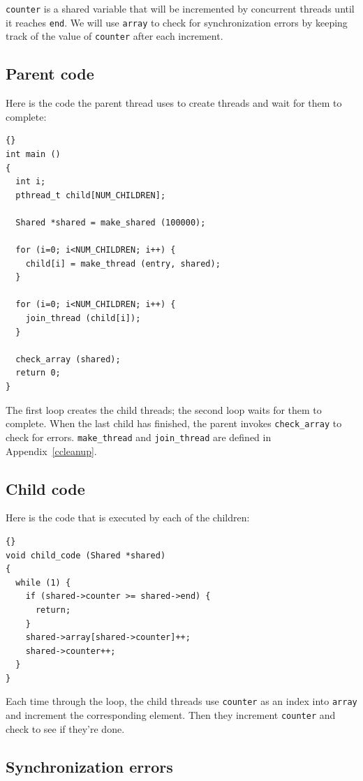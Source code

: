 \documentclass{book}
\begin{document}
{\tt counter} is a shared variable that will be incremented by
concurrent threads until it reaches {\tt end}.  We will use
{\tt array} to check for synchronization errors by keeping track
of the value of {\tt counter} after each increment.

\subsection{Parent code}

Here is the code the parent thread uses to create threads
and wait for them to complete:

\begin{lstlisting}[title={}]{}
int main ()
{
  int i;
  pthread_t child[NUM_CHILDREN];

  Shared *shared = make_shared (100000);

  for (i=0; i<NUM_CHILDREN; i++) {
    child[i] = make_thread (entry, shared);
  }

  for (i=0; i<NUM_CHILDREN; i++) {
    join_thread (child[i]);
  }

  check_array (shared);
  return 0;
}
\end{lstlisting}

The first loop creates the child threads; the second loop waits
for them to complete.  When the last child has finished, the parent
invokes {\tt check\_array} to check for errors.
{\tt make\_thread} and {\tt join\_thread} are defined in
Appendix~\ref{ccleanup}.

\subsection{Child code}

Here is the code that is executed by each of the children:

\begin{lstlisting}[title={}]{}
void child_code (Shared *shared)
{
  while (1) {
    if (shared->counter >= shared->end) {
      return;
    }
    shared->array[shared->counter]++;
    shared->counter++;
  }
}
\end{lstlisting}

Each time through the loop, the child threads use {\tt counter}
as an index into {\tt array} and increment the corresponding element.
Then they increment {\tt counter} and check to see if they're done.

\subsection{Synchronization errors}
\end{document}
